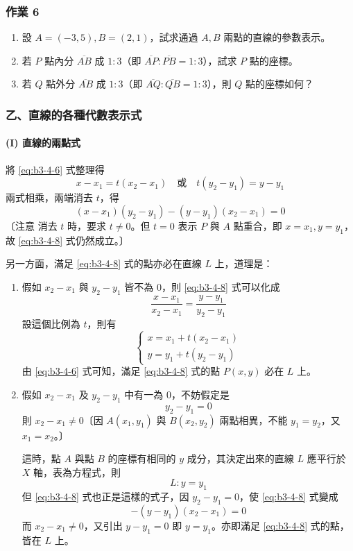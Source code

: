 \subsubsection*{作業 6}
\begin{enumerate}[label=(\roman*), leftmargin=2em]
  \item 設 $A = (-3, 5), B = (2, 1)$，試求通過 $A, B$ 兩點的直線的參數表示。
  \item 若 $P$ 點內分 $\overline{AB}$ 成 $1 : 3$（即 $\overline{AP} : \overline{PB} = 1 : 3$），試求 $P$ 點的座標。
  \item 若 $Q$ 點外分 $\overline{AB}$ 成 $1 : 3$（即 $\overline{AQ} : \overline{QB} = 1 : 3$），則 $Q$ 點的座標如何？
\end{enumerate}

\subsubsection*{乙、直線的各種代數表示式}

\paragraph*{(I) 直線的兩點式}
將 \eqref{eq:b3-4-6} 式整理得
\[ x - x_1 = t(x_2 - x_1) \quad\text{或}\quad t(y_2 - y_1) = y - y_1 \]
兩式相乘，兩端消去 $t$，得
\begin{equation}
(x - x_1)(y_2 - y_1) - (y - y_1)(x_2 - x_1) = 0
\label{eq:b3-4-8}
\end{equation}
〔注意 消去 $t$ 時，要求 $t \neq 0$。但 $t = 0$ 表示 $P$ 與 $A$ 點重合，即 $x = x_1, y = y_1$，故 \eqref{eq:b3-4-8} 式仍然成立。〕

另一方面，滿足 \eqref{eq:b3-4-8} 式的點亦必在直線 $L$ 上，道理是：
\begin{enumerate}[label=(\alph*), leftmargin=2em]
  \item 假如 $x_2 - x_1$ 與 $y_2 - y_1$ 皆不為 0，則 \eqref{eq:b3-4-8} 式可以化成
  \[ \frac{x - x_1}{x_2 - x_1} = \frac{y - y_1}{y_2 - y_1} \]
  設這個比例為 $t$，則有
  \[ \begin{cases} x = x_1 + t(x_2 - x_1) \\ y = y_1 + t(y_2 - y_1) \end{cases} \]
  由 \eqref{eq:b3-4-6} 式可知，滿足 \eqref{eq:b3-4-8} 式的點 $P(x, y)$ 必在 $L$ 上。
  
  \item 假如 $x_2 - x_1$ 及 $y_2 - y_1$ 中有一為 0，不妨假定是
  \[ y_2 - y_1 = 0 \]
  則 $x_2 - x_1 \neq 0$〔因 $A(x_1, y_1)$ 與 $B(x_2, y_2)$ 兩點相異，不能 $y_1 = y_2$，又 $x_1 = x_2$。〕
  
  這時，點 $A$ 與點 $B$ 的座標有相同的 $y$ 成分，其決定出來的直線 $L$ 應平行於 $X$ 軸，表為方程式，則
  \[ L : y = y_1 \]
  但 \eqref{eq:b3-4-8} 式也正是這樣的式子，因 $y_2 - y_1 = 0$，使 \eqref{eq:b3-4-8} 式變成
  \[ -(y - y_1)(x_2 - x_1) = 0 \]
  而 $x_2 - x_1 \neq 0$，又引出 $y - y_1 = 0$ 即 $y = y_1$。亦即滿足 \eqref{eq:b3-4-8} 式的點，皆在 $L$ 上。
\end{enumerate}

